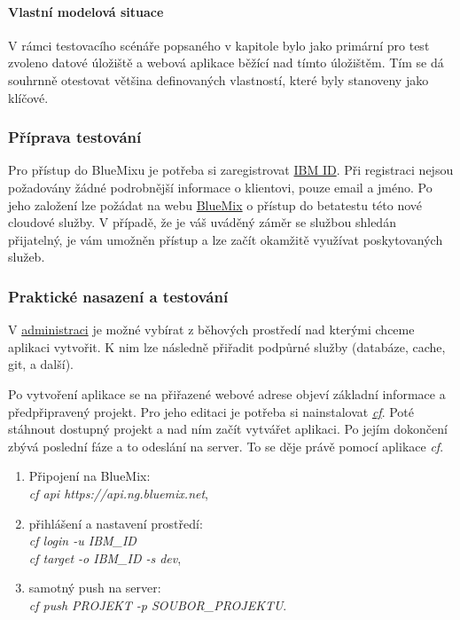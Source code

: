 \paragraph{Vlastní modelová situace}
V rámci testovacího scénáře popsaného v kapitole  bylo jako primární pro test zvoleno datové úložiště a webová aplikace běžící nad tímto úložištěm. Tím se dá souhrnně otestovat většina definovaných vlastností, které byly stanoveny jako klíčové.

\subsubsection{Příprava testování}
Pro přístup do BlueMixu je potřeba si zaregistrovat \href{https://www.ibm.com/account/profile}{IBM ID}. Při registraci nejsou požadovány žádné podrobnější informace o klientovi, pouze email a jméno. Po jeho založení lze požádat na webu \href{https://ace.ng.bluemix.net}{BlueMix\cite{bluemix:web}} o přístup do betatestu této nové cloudové služby. V případě, že je váš uváděný záměr se službou shledán přijatelný, je vám umožněn přístup a lze začít okamžitě využívat poskytovaných služeb.

\subsubsection{Praktické nasazení a testování}
V \href{https://ace.ng.bluemix.net/#/resources}{administraci} je možné vybírat z běhových prostředí nad kterými chceme aplikaci vytvořit. K nim lze následně přiřadit podpůrné služby (databáze, cache, git, a další).

Po vytvoření aplikace se na přiřazené webové adrese objeví základní informace a předpřipravený projekt. Pro jeho editaci je potřeba si nainstalovat \href{https://www.ng.bluemix.net/docs/BuildingWeb.jsp#install-cf}{\textit{cf}}. Poté stáhnout dostupný projekt a nad ním začít vytvářet aplikaci. Po jejím dokončení zbývá poslední fáze a to odeslání na server. To se děje právě pomocí aplikace \textit{cf}.
\begin{enumerate}
	\item Připojení na BlueMix:\\
		\textit{cf api https://api.ng.bluemix.net},
	\item přihlášení a nastavení prostředí:\\
		\textit{cf login -u IBM\_ID}\\
		\textit{cf target -o IBM\_ID -s dev},
	\item samotný push na server:\\
		\textit{cf push PROJEKT -p SOUBOR\_PROJEKTU}.
\end{enumerate}

